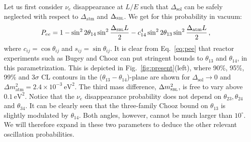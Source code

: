 \documentclass[12pt]{elsart}
\newcommand{\eVq}{\ensuremath{\text{eV}^2}}
\newcommand{\Dmq}{\Delta m^2}
\newcommand{\Sol}{\text{sol}}
\newcommand{\Atm}{\text{atm}}
\newcommand{\Sbl}{\textsc{sbl}}
\begin{document}
Let us first consider $\nu_e$ disappearance at $L/E$ such that
$\Delta_\Sol$ can be safely neglected with respect to $\Delta_\Atm$
and $\Delta_\Sbl$. We get for this probability in vacuum:
%
\begin{equation}
    \label{eq:pee}
    P_{ee} = 1 - \sin^2 2 \theta_{14} \sin^2 \frac{\Delta_\Sbl L }{2} 
    - c^4_{14} \sin^2 2 \theta_{13} \sin^2 \frac{\Delta_\Atm L}{2} \, ,
\end{equation}
%
where $c_{ij} = \cos \theta_{ij}$ and $s_{ij} = \sin \theta_{ij}$. It
is clear from Eq.~\eqref{eq:pee} that reactor experiments such as
Bugey and Chooz can put stringent bounds to $\theta_{13}$ and
$\theta_{14}$, in this parametrization. This is depicted in
Fig.~\ref{fig:present}(left), where 90\%, 95\%, 99\% and 3$\sigma$ CL
contours in the ($\theta_{13}-\theta_{14}$)-plane are shown for
$\Delta_\Sol \to 0$ and $\Dmq_\Atm = 2.4 \times 10^{-3}~\eVq$. The
third mass difference, $\Dmq_\Sbl$, is free to vary above $0.1~\eVq$.
Notice that the $\nu_e$ disappearance probability does not depend on
$\theta_{23},\theta_{24}$ and $\theta_{34}$.  It can be clearly seen
that the three-family Chooz bound on $\theta_{13}$ is slightly
modulated by $\theta_{14}$.  Both angles, however, cannot be much
larger than $10^\circ$. We will therefore expand in these two
parameters to deduce the other relevant oscillation probabilities. 
\end{document}
